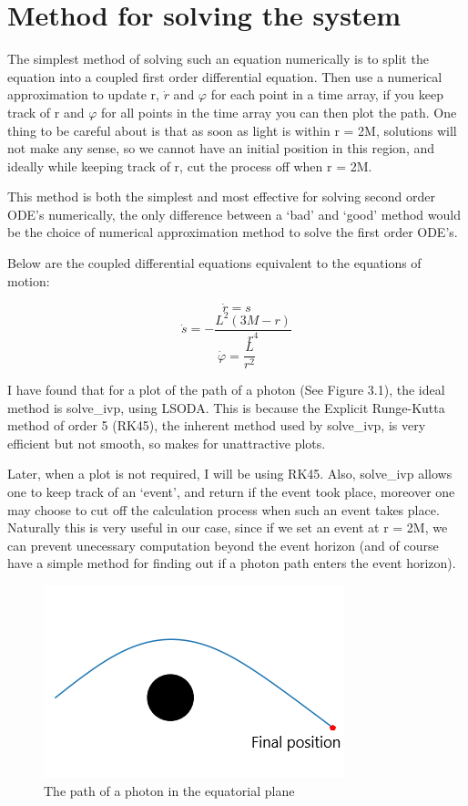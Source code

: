 \documentclass[oneside,openright,frontopenright, singlespacing]{dmathesis}
\begin{document}
\section{Method for solving the system}

	The simplest method of solving such an equation numerically is to split the equation into a coupled first order differential equation. Then use a numerical approximation to update r, $\dot{r}$ and $\varphi$ for each point in a time array, if you keep track of r and $\varphi$ for all points in the time array you can then plot the path. One thing to be careful about is that as soon as light is within r = 2M, solutions will not make any sense, so we cannot have an initial position in this region, and ideally while keeping track of r, cut the process off when r = 2M.

\vspace{1em}
	This method is both the simplest and most effective for solving second order ODE’s numerically, the only difference between a ‘bad’ and ‘good’ method would be the choice of numerical approximation method to solve the first order ODE’s.

\vspace{1em}
	Below are the coupled differential equations equivalent to the equations of motion:

	\[\dot{r}= s\]
	\[\dot{s}=-\frac{L^2(3M-r)}{r^4}\]
	\[\dot{\varphi}=\frac{L}{r^2}\]

\vspace{1em}
	I have found that for a plot of the path of a photon (See Figure 3.1), the ideal method is solve\_ivp\cite{2020SciPy-NMeth}, using LSODA\cite{hindmarsh2005lsoda}. This is because the Explicit Runge-Kutta method of order 5 (RK45)\cite{fehlberg1969low}, the inherent method used by solve\_ivp, is very efficient but not smooth, so makes for unattractive plots. 

\vspace{1em}
	Later, when a plot is not required, I will be using RK45. Also, solve\_ivp allows one to keep track of an ‘event’, and return if the event took place, moreover one may choose to cut off the calculation process when such an event takes place. Naturally this is very useful in our case, since if we set an event at r = 2M, we can prevent unecessary computation beyond the event horizon (and of course have a simple method for finding out if a photon path enters the event horizon).

\begin{figure}[!ht]
	\centering
	\includegraphics[width=0.4\linewidth]{img/Schwarzschildpath}
	\caption{The path of a photon in the equatorial plane}
\end{figure}
\end{document}
